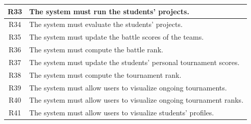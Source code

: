 \begin{longtable}{|c|l|}
    R33 \label{R.33}& The system must run the students' projects. \\ \hline
    R34 \label{R.34}& The system must evaluate the students' projects. \\ \hline
    R35 \label{R.35}& The system must update the battle scores of the teams. \\ \hline
    R36 \label{R.36}& The system must compute the battle rank. \\ \hline
    R37 \label{R.37}& The system must update the students' personal tournament scores. \\ \hline
    R38 \label{R.38}& The system must compute the tournament rank. \\ \hline
    R39 \label{R.39}& The system must allow users to visualize ongoing tournaments. \\ \hline
    R40 \label{R.40}& The system must allow users to visualize ongoing tournament ranks. \\ \hline
    R41 \label{R.41}& The system must allow users to visualize students' profiles. \\ \hline
    \end{longtable}

